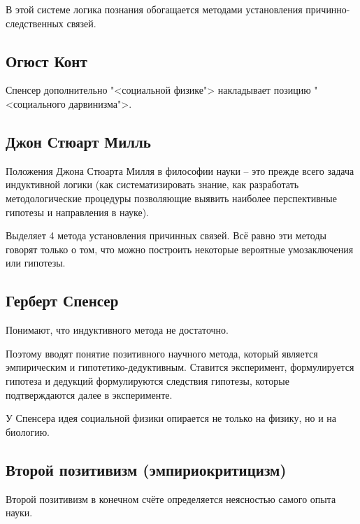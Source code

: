 \documentclass[main.tex]{subfiles}
\begin{document}
В этой системе логика познания обогащается методами установления причинно-следственных связей.

\subsection{Огюст Конт}


Спенсер дополнительно "<социальной физике"> накладывает позицию "<социального дарвинизма">.

\subsection{Джон Стюарт Милль}


Положения Джона Стюарта Милля в философии науки -- это прежде всего задача индуктивной логики (как систематизировать знание, как разработать методологические процедуры позволяющие выявить наиболее перспективные гипотезы и направления в науке).

Выделяет 4 метода установления причинных связей.
Всё равно эти методы говорят только о том, что можно построить некоторые вероятные умозаключения или гипотезы. 

\subsection{Герберт Спенсер}


Понимают, что индуктивного метода не достаточно.

Поэтому вводят понятие позитивного научного метода, который является эмпирическим и гипотетико-дедуктивным.
Ставится эксперимент, формулируется гипотеза и дедукций формулируются следствия гипотезы, которые подтверждаются далее в эксперименте.

У Спенсера идея социальной физики опирается не только на физику, но и на биологию.

\subsection{Второй позитивизм (эмпириокритицизм)}


Второй позитивизм в конечном счёте определяется неясностью самого опыта науки.
\end{document}
